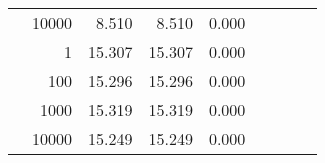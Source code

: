 \begin{table}
\begin{tabular}{rrrrrrrrr}
	            
					 &  
					 
					\multirow{ 1 }{*}{ 10000 } &
					
						
							    
							    
	                           8.510 & 8.510 & 0.000  \\
	                
	            
	        
				\noalign{\smallskip}\hline
				\multirow{ 4 }{*}{ 2000000 } &
				
					
					 
					\multirow{ 1 }{*}{ 1 } &
					
						
							    
							    
	                           15.307 & 15.307 & 0.000  \\
	                
	            
					 &  
					 
					\multirow{ 1 }{*}{ 100 } &
					
						
							    
							    
	                           15.296 & 15.296 & 0.000  \\
	                
	            
					 &  
					 
					\multirow{ 1 }{*}{ 1000 } &
					
						
							    
							    
	                           15.319 & 15.319 & 0.000  \\
	                
	            
					 &  
					 
					\multirow{ 1 }{*}{ 10000 } &
					
						
							    
							    
	                           15.249 & 15.249 & 0.000  \\
	                
	            
	        

\hline

\end{tabular}
\end{table}
\clearpage


	    

